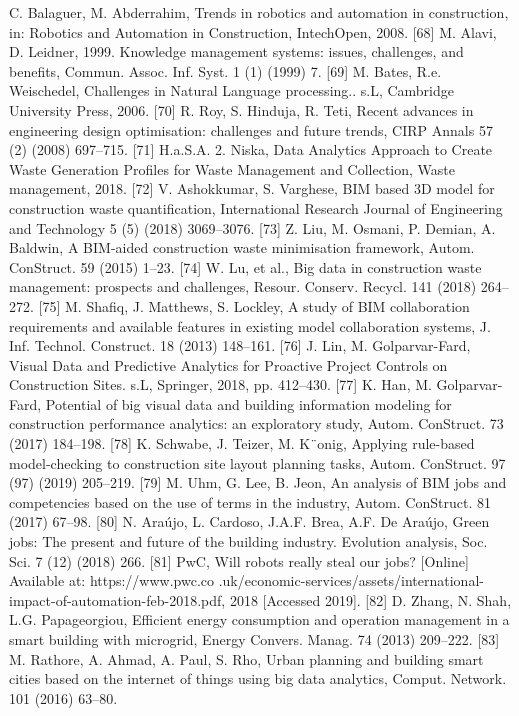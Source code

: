 \documentclass[towcolumn, 11pt]{Article}
\begin{document}
\begin{چکیده}
[67] C. Balaguer, M. Abderrahim, Trends in robotics and automation in construction, in: Robotics and Automation in Construction, IntechOpen, 2008. 
[68] M. Alavi, D. Leidner, 1999. Knowledge management systems: issues, challenges, and benefits, Commun. Assoc. Inf. Syst. 1 (1) (1999) 7. 
[69] M. Bates, R.e. Weischedel, Challenges in Natural Language processing.. s.L, Cambridge University Press, 2006. 
[70] R. Roy, S. Hinduja, R. Teti, Recent advances in engineering design optimisation: challenges and future trends, CIRP Annals 57 (2) (2008) 697–715. 
[71] H.a.S.A. 2. Niska, Data Analytics Approach to Create Waste Generation Profiles for Waste Management and Collection, Waste management, 2018. 
[72] V. Ashokkumar, S. Varghese, BIM based 3D model for construction waste quantification, International Research Journal of Engineering and Technology 5 (5) (2018) 3069–3076. 
[73] Z. Liu, M. Osmani, P. Demian, A. Baldwin, A BIM-aided construction waste minimisation framework, Autom. ConStruct. 59 (2015) 1–23. 
[74] W. Lu, et al., Big data in construction waste management: prospects and challenges, Resour. Conserv. Recycl. 141 (2018) 264–272. 
[75] M. Shafiq, J. Matthews, S. Lockley, A study of BIM collaboration requirements and available features in existing model collaboration systems, J. Inf. Technol. Construct. 18 (2013) 148–161. 
[76] J. Lin, M. Golparvar-Fard, Visual Data and Predictive Analytics for Proactive Project Controls on Construction Sites. s.L, Springer, 2018, pp. 412–430. 
[77] K. Han, M. Golparvar-Fard, Potential of big visual data and building information modeling for construction performance analytics: an exploratory study, Autom. ConStruct. 73 (2017) 184–198. 
[78] K. Schwabe, J. Teizer, M. K¨onig, Applying rule-based model-checking to construction site layout planning tasks, Autom. ConStruct. 97 (97) (2019) 205–219. 
[79] M. Uhm, G. Lee, B. Jeon, An analysis of BIM jobs and competencies based on the use of terms in the industry, Autom. ConStruct. 81 (2017) 67–98. 
[80] N. Araújo, L. Cardoso, J.A.F. Brea, A.F. De Araújo, Green jobs: The present and future of the building industry. Evolution analysis, Soc. Sci. 7 (12) (2018) 266. 
[81] PwC, Will robots really steal our jobs? [Online] Available at: https://www.pwc.co .uk/economic-services/assets/international-impact-of-automation-feb-2018.pdf, 2018 [Accessed 2019]. 
[82] D. Zhang, N. Shah, L.G. Papageorgiou, Efficient energy consumption and operation management in a smart building with microgrid, Energy Convers. Manag. 74 (2013) 209–222. 
[83] M. Rathore, A. Ahmad, A. Paul, S. Rho, Urban planning and building smart cities based on the internet of things using big data analytics, Comput. Network. 101 (2016) 63–80. 

\end{چکیده}
\end{document}
